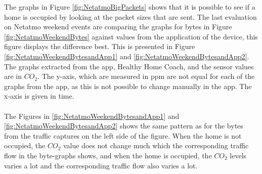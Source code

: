The graphs in Figure \ref{fig:NetatmoBigPackets} shows that it is possible to see if a home is occupied by looking at the packet sizes that are sent. The last evaluation on Netatmo weekend events are comparing the graphs for bytes in Figure \ref{fig:NetatmoWeekendBytes} against values from the application of the device, this figure displays the difference best. This is presented in Figure \ref{fig:NetatmoWeekendBytesandApp1} and \ref{fig:NetatmoWeekendBytesandApp2}. The graphs extracted from the app, Healthy Home Coach, and the sensor values are in \(CO_2\). The y-axis, which are measured in ppm are not equal for each of the graphs from the app, as this is not possible to change manually in the app. The x-axis is given in time. 
\\\\
The Figures in \ref{fig:NetatmoWeekendBytesandApp1} and \ref{fig:NetatmoWeekendBytesandApp2} shows the same pattern as for the bytes from the traffic captures on the left side of the figure. When the home is not occupied, the \(CO_2\) value does not change much which the corresponding traffic flow in the byte-graphs shows, and when the home is occupied, the \(CO_2\) levels varies a lot and the corresponding traffic flow also varies a lot. 

